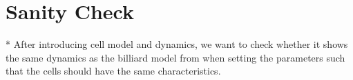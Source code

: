 \section{Sanity Check}

* After introducing cell model and dynamics, we want to check whether it shows the same dynamics as the billiard model from \cite{Bruna2012} when setting the parameters such that the cells should have the same characteristics. 